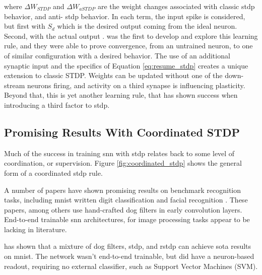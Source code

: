     \noindent where $\Delta W_{STDP}$ and $\Delta W_{aSTDP}$ are the weight changes
    associated with classic \Gls{stdp} behavior, and anti- \Gls{stdp}
    behavior. In each term, the input spike is considered, but first with
    $S_{d}$ which is the desired output coming from the ideal neuron. Second,
    with the actual output \parencite{mozafari_2018}. \parencite{ponulak_2010} was
    the first to develop and explore this learning rule, and they were able to
    prove convergence, from an untrained neuron, to one of similar configuration
    with a desired behavior. The use of an additional synaptic input and the
    specifics of Equation \ref{eq:resume_stdp} creates a unique extension to
    classic STDP. Weights can be updated without one of the down-stream neurons
    firing, and activity on a third synapse is influencing plasticity. Beyond
    that, this is yet another learning rule, that has shown success when
    introducing a third factor to \Gls{stdp}.



    \subsection{Promising Results With Coordinated STDP}
    Much of the success in training \gls{snn} with \gls{stdp} relates back to
    some level of coordination, or supervision. Figure
    \ref{fig:coordinated_stdp} shows the general form of a coordinated
    \gls{stdp} rule.

    
    A number of papers have shown promising results on benchmark
    recognition tasks, including \Gls{mnist} written digit classification
    \parencite{mozafari_2018} and facial recognition
    \parencite{delorme_2001}. These papers, among others use hand-crafted
    \gls{dog} filters in early convolution layers. End-to-end
    trainable \Gls{snn} architectures, for image processing tasks appear to be
    lacking in literature.
    
    \parencite{mozafari_2018} has shown that a mixture of \Gls{dog} filters, \gls{stdp}, and
    \gls{rstdp} can achieve \acrshort{sota} results on \Gls{mnist}. The
    network wasn't end-to-end trainable, but did have a neuron-based readout,
    requiring no external classifier, such as Support Vector Machines (SVM).
    
